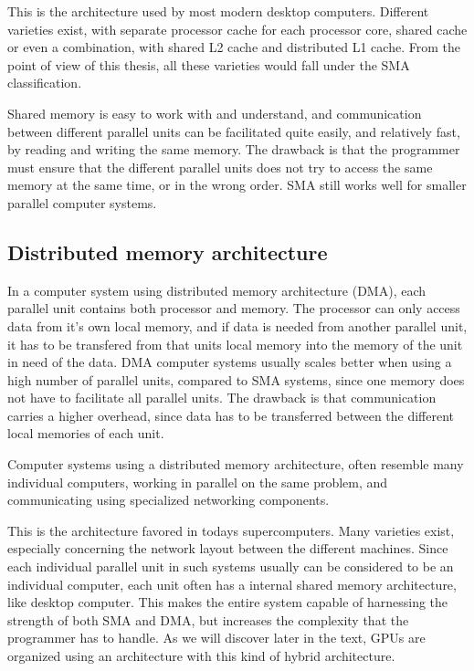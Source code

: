 This is the architecture used by most modern desktop computers. Different varieties exist, with separate processor cache for each processor core, shared cache or even a combination, with shared L2 cache and distributed L1 cache. From the point of view of this thesis, all these varieties would fall under the SMA classification.

Shared memory is easy to work with and understand, and communication between different parallel units can be facilitated quite easily, and relatively fast, by reading and writing the same memory. The drawback is that the programmer must ensure that the different parallel units does not try to access the same memory at the same time, or in the wrong order. SMA still works well for smaller parallel computer systems.

\subsection{Distributed memory architecture} %
\label{sub:distributed_memory_architecture}

In a computer system using distributed memory architecture (DMA), each parallel unit contains both processor and memory. The processor can only access data from it's own local memory, and if data is needed from another parallel unit, it has to be transfered from that units local memory into the memory of the unit in need of the data. DMA computer systems usually scales better when using a high number of parallel units, compared to SMA systems, since one memory does not have to facilitate all parallel units. The drawback is that communication carries a higher overhead, since data has to be transferred between the different local memories of each unit.

Computer systems using a distributed memory architecture, often resemble many individual computers, working in parallel on the same problem, and communicating using specialized networking components.

This is the architecture favored in todays supercomputers. Many varieties exist, especially concerning the network layout between the different machines. Since each individual parallel unit in such systems usually can be considered to be an individual computer, each unit often has a internal shared memory architecture, like desktop computer. This makes the entire system capable of harnessing the strength of both SMA and DMA, but increases the complexity that the programmer has to handle. As we will discover later in the text, GPUs are organized using an architecture with this kind of hybrid architecture.

